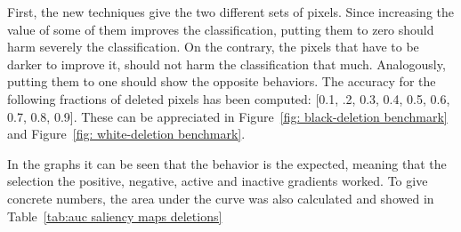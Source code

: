 \documentclass[preprint,12pt]{elsarticle}
\begin{document}
First, the new techniques give the two different sets of pixels. Since increasing the value of some of them improves the classification, putting them to zero should harm severely the classification. On the contrary, the pixels that have to be darker to improve it, should not harm the classification that much. Analogously, putting them to one should show the opposite behaviors. The accuracy for the following fractions of deleted pixels has been computed: [0.1, .2, 0.3, 0.4, 0.5, 0.6, 0.7, 0.8, 0.9]. These can be appreciated in Figure~\ref{fig: black-deletion benchmark} and Figure~\ref{fig: white-deletion benchmark}.

In the graphs it can be seen that the behavior is the expected, meaning that the selection the positive, negative, active and inactive gradients worked. To give concrete numbers, the area under the curve was also calculated and showed in Table~\ref{tab:auc saliency maps deletions}
\end{document}
